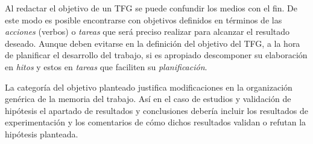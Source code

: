 Al redactar el objetivo de un TFG se puede confundir los medios con el 
fin. De este modo es posible encontrarse con objetivos definidos en términos de las 
\emph{acciones} (verbos) o \emph{tareas} que será preciso 
realizar para alcanzar el resultado deseado. Aunque deben evitarse en la definición del objetivo del TFG, a la hora de 
planificar el desarrollo del trabajo, si es apropiado descomponer su elaboración en \emph{hitos} y estos en \emph{tareas} que faciliten su 
\emph{planificación}.

La categoría del objetivo planteado justifica modificaciones en la organización genérica de la memoria del trabajo. Así en el caso de estudios y validación de hipótesis el apartado de resultados y conclusiones debería incluir los resultados de experimentación y los comentarios de cómo dichos resultados validan o refutan la hipótesis planteada.

